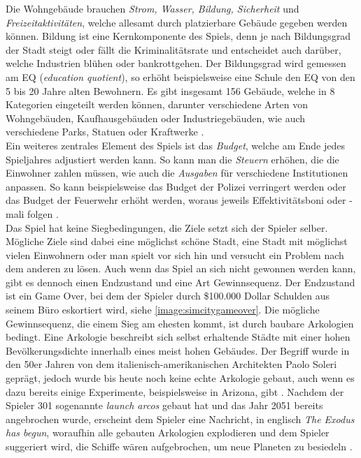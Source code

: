 Die Wohngebäude brauchen \textit{Strom, Wasser, Bildung, Sicherheit} und \textit{Freizeitaktivitäten}, welche allesamt durch platzierbare Gebäude gegeben werden können. Bildung ist eine Kernkomponente des Spiels, denn je nach Bildungsgrad der Stadt steigt oder fällt die Kriminalitätsrate und entscheidet auch darüber, welche Industrien blühen oder bankrottgehen. Der Bildungsgrad wird gemessen am EQ (\textit{education quotient}), so erhöht beispielsweise eine Schule den EQ von den 5 bis 20 Jahre alten Bewohnern. Es gibt insgesamt 156 Gebäude, welche in 8 Kategorien eingeteilt werden können, darunter verschiedene Arten von Wohngebäuden, Kaufhausgebäuden oder Industriegebäuden, wie auch verschiedene Parks, Statuen oder Kraftwerke \cite*[]{simcity:fandom}. \\
Ein weiteres zentrales Element des Spiels ist das \textit{Budget}, welche am Ende jedes Spieljahres adjustiert werden kann. So kann man die \textit{Steuern} erhöhen, die die Einwohner zahlen müssen, wie auch die \textit{Ausgaben} für verschiedene Institutionen anpassen. So kann beispielsweise das Budget der Polizei verringert werden oder das Budget der Feuerwehr erhöht werden, woraus jeweils Effektivitätsboni oder -mali folgen \cite*[]{simcity:video}. \\
Das Spiel hat keine Siegbedingungen, die Ziele setzt sich der Spieler selber. Mögliche Ziele sind dabei eine möglichst schöne Stadt, eine Stadt mit möglichst vielen Einwohnern oder man spielt vor sich hin und versucht ein Problem nach dem anderen zu lösen. Auch wenn das Spiel an sich nicht gewonnen werden kann, gibt es dennoch einen Endzustand und eine Art Gewinnsequenz. Der Endzustand ist ein Game Over, bei dem der Spieler durch \$100.000 Dollar Schulden aus \glqq seinem Büro eskortiert wird\grqq, siehe \autoref{image:simcitygameover}. Die mögliche Gewinnsequenz, die einem Sieg am ehesten kommt, ist durch baubare Arkologien bedingt. Eine Arkologie beschreibt sich selbst erhaltende Städte mit einer hohen Bevölkerungsdichte innerhalb eines meist hohen Gebäudes. Der Begriff wurde in den 50er Jahren von dem italienisch-amerikanischen Architekten Paolo Soleri geprägt, jedoch wurde bis heute noch keine echte Arkologie gebaut, auch wenn es dazu bereits einige Experimente, beispielsweise in Arizona, gibt \cite*[]{misc:arcology}. Nachdem der Spieler 301 sogenannte \textit{launch arcos} gebaut hat und das Jahr 2051 bereits angebrochen wurde, erscheint dem Spieler eine Nachricht, in englisch \textit{\glqq The Exodus has begun\grqq}, woraufhin alle gebauten Arkologien explodieren und dem Spieler suggeriert wird, die Schiffe wären aufgebrochen, um neue Planeten zu besiedeln \cite*[]{simcity:arcology}. \\
